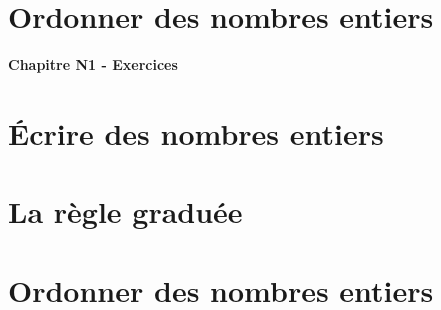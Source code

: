 \documentclass[10pt,a4paper]{report}
\begin{document}
\section{Ordonner des nombres entiers}





\newpage

\setcounter{section}{0}

\hrulefill
\vspace{3mm}
\begin{center}
{\Huge \textbf{Chapitre N1 - Exercices}}
\end{center}
\hrulefill

\section{Écrire des nombres entiers}









\section{La règle graduée}




\section{Ordonner des nombres entiers}




\end{document}
